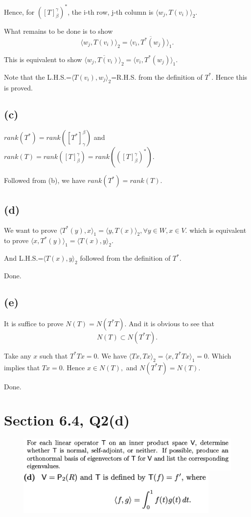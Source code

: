 \documentclass[12pt]{article}%
\begin{document}
Hence, for $([T]_{\beta}^{\gamma})^*$, the i-th row, j-th column is $\langle w_j,T(v_i) \rangle_2$.

What remains to be done is to show $$\langle w_j,T(v_i) \rangle_2 = \overline{\langle v_i,T^*(w_j) \rangle_1}.$$

This is equivalent to show $\overline{\langle w_j,T(v_i) \rangle_2} = \langle v_i,T^*(w_j) \rangle_1.$

Note that the L.H.S.=$\langle T(v_i),w_j \rangle_2$=R.H.S. from the definition of $T^*.$ Hence this is proved.

\subsection{(c)}

$rank(T^*)=rank([T^*]_\gamma^{\beta})$ and $rank(T)=rank([T]_\beta^{\gamma})=rank(([T]_\beta^{\gamma})^*).$

Followed from (b), we have $rank(T^*)=rank(T).$

\subsection{(d)}
We want to prove $\langle T^*(y),x \rangle_1=\langle y,T(x) \rangle_2, \forall y\in W, x \in V.$ 
which is equivalent to prove $\langle x, T^*(y) \rangle_1=\langle T(x),y \rangle_2$.

And L.H.S.=$\langle T(x),y \rangle_2$ followed from the definition of $T^*$.

Done.

\subsection{(e)}
It is suffice to prove $N(T)=N(T^*T).$ And it is obvious to see that $$N(T) \subset N(T^*T).$$

Take any $x$ such that $T^*Tx = 0.$ We have $\langle Tx,Tx \rangle_2=\langle x,T^*Tx \rangle_1=0.$ 
Which implies that $Tx=0.$ Hence $x \in N(T),$ and $N(T^*T)=N(T).$

Done.

\newpage

\section{Section 6.4, Q2(d)}
\begin{figure}[htp]
    \includegraphics[width = 16cm]{img/Q5a.png}
    \includegraphics[width = 10cm]{img/Q5b.png}
\end{figure}
\end{document}
